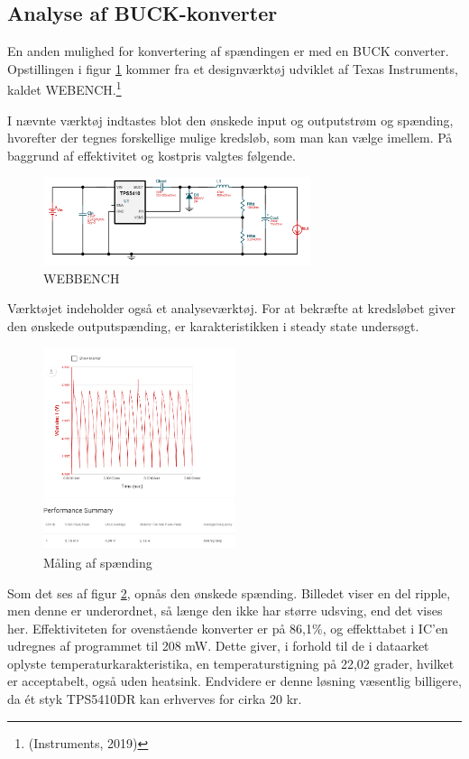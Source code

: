 \subsection{Analyse af BUCK-konverter}
\label{sec:analyse-af-buck}

En anden mulighed for konvertering af spændingen er med en BUCK converter. Opstillingen i figur \ref{fig:j4} kommer fra et designværktøj udviklet af Texas Instruments, kaldet WEBENCH.\footnote{(Instruments, 2019)}

I nævnte værktøj indtastes blot den ønskede input og outputstrøm og spænding, hvorefter der tegnes forskellige mulige kredsløb, som man kan vælge imellem. På baggrund af effektivitet og kostpris valgtes følgende. 

\begin{figure}[h]
  \centering
  \includegraphics[width=0.7\textwidth]{./figurer/j4.png}
  \caption{WEBBENCH}
  \label{fig:j4}
\end{figure}

Værktøjet indeholder også et analyseværktøj. For at bekræfte at kredsløbet giver den ønskede outputspænding, er  karakteristikken i steady state undersøgt.

\begin{figure}[h]
  \centering
  \includegraphics[width=0.5\textwidth]{./figurer/j5.png}
  \caption{Måling af spænding}
  \label{fig:j5}
\end{figure}

Som det ses af figur \ref{fig:j5}, opnås den ønskede spænding. Billedet viser en del ripple, men denne er underordnet, så længe den ikke har større udsving, end det vises her. Effektiviteten for ovenstående konverter er på 86,1\%, og effekttabet i IC'en udregnes af programmet til 208 mW. Dette giver, i forhold til de i dataarket oplyste temperaturkarakteristika, en temperaturstigning på 22,02 grader, hvilket er acceptabelt, også uden heatsink. Endvidere er denne løsning væsentlig billigere, da ét styk TPS5410DR kan erhverves for cirka 20 kr.

